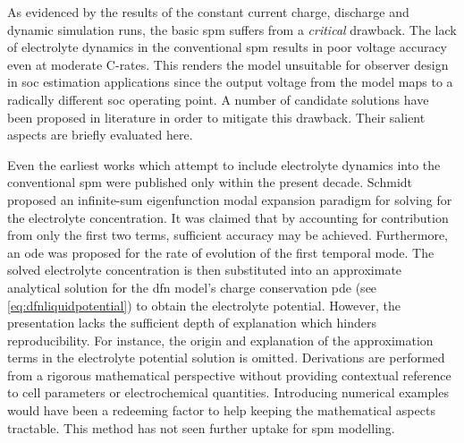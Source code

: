
As  evidenced by  the  results of  the constant  current  charge, discharge  and
dynamic  simulation runs,  the basic  \gls{spm} suffers  from a  \emph{critical}
drawback. The lack of electrolyte dynamics in the conventional \gls{spm} results
in poor  voltage accuracy  even at  moderate {C-rates}.  This renders  the model
unsuitable for  observer design in  \gls{soc} estimation applications  since the
output voltage from the model maps  to a radically different \gls{soc} operating
point. A number of candidate solutions have been proposed in literature in order
to mitigate this drawback. Their salient aspects are briefly evaluated here.

Even  the earliest  works which  attempt  to include  electrolyte dynamics  into
the  conventional  \gls{spm} were  published  only  within the  present  decade.
Schmidt~\etal~\cite{Schmidt2010c} proposed  an infinite-sum  eigenfunction modal
expansion paradigm for solving for the electrolyte concentration. It was claimed
that by  accounting for contribution from  only the first two  terms, sufficient
accuracy may be achieved. Furthermore, an \gls{ode} was proposed for the rate of
evolution of  the first temporal  mode. The solved electrolyte  concentration is
then  substituted into  an  approximate analytical  solution  for the  \gls{dfn}
model's  charge  conservation  \gls{pde} (see  \cref{eq:dfnliquidpotential})  to
obtain the electrolyte potential. However, the presentation lacks the sufficient
depth of explanation which hinders reproducibility. For instance, the origin and
explanation of the approximation terms  in the electrolyte potential solution is
omitted.  Derivations are  performed  from a  rigorous mathematical  perspective
without  providing contextual  reference to  cell parameters  or electrochemical
quantities. Introducing numerical examples would have been a redeeming factor to
help  keeping the  mathematical  aspects  tractable. This  method  has not  seen
further uptake for \gls{spm} modelling.

